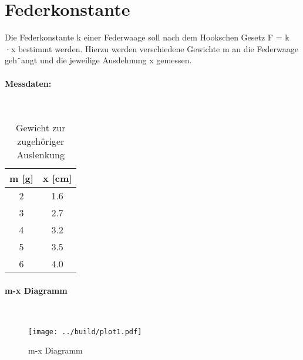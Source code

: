 \section{Federkonstante}
Die Federkonstante k einer Federwaage soll nach dem Hookschen Gesetz F =
k ·x bestimmt werden. Hierzu werden verschiedene Gewichte m an die Federwaage geh¨angt und die jeweilige Ausdehnung x gemessen.

\paragraph{Messdaten:} \mbox{} \\

\begin{table}
    \centering
    \caption{Gewicht zur zugehöriger Auslenkung}
    \label{tab:Gewicht}
        \begin{tabular}{c c}
        \toprule
        m [g] & x [cm] \\
        \midrule
        2 & 1.6      \\
        3 & 2.7     \\
        4 & 3.2   \\
        5 & 3.5  \\
        6 & 4.0 \\
        \bottomrule
    \end{tabular}
\end{table}

\paragraph{m-x Diagramm} \mbox{} \\

\begin{figure}
    \centering
    \texttt{[image: ../build/plot1.pdf]}
    \caption{m-x Diagramm}
    \label{fig:plot1}
\end{figure}